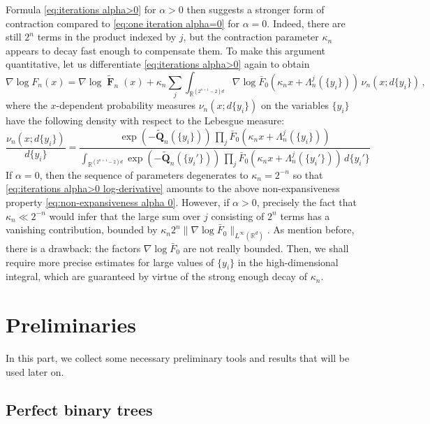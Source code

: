\documentclass[reqno]{amsart}
\DeclareMathOperator{\bF}{\boldsymbol{F}}
\numberwithin{equation}{section}
\begin{document}
{Formula \eqref{eq:iterations alpha>0} for $\alpha>0$ then suggests a stronger form of contraction compared to \eqref{eq:one iteration alpha=0} for $\alpha=0$. Indeed, there are still $2^n$ terms in the product indexed by $j$, but the contraction parameter $\kappa_n$ appears to decay fast enough to compensate them. To make this argument quantitative, let us differentiate \eqref{eq:iterations alpha>0} again to obtain
\begin{equation}\label{eq:iterations alpha>0 log-derivative}
\nabla \log F_n(x) = \nabla \log   \widetilde{\bF}_n (x) + \kappa_n \sum_j \int_{\mathbb{R}^{(2^{n+1}-2)d}} \nabla \log \bar F_0(\kappa_n x+\Lambda_n^j(\{y_i\})) \, \nu_n(x;d\{y_i\}) \,, 
\end{equation}
where the $x$-dependent probability measures $\nu_n(x;d\{y_i\})$ on the variables $\{y_i\}$ have the following density with respect to the Lebesgue measure:
$$
\frac{\nu_n(x;d\{y_i\})}{d\{y_i\}}=\frac{\exp(-\widetilde{\mathbf{Q}}_n(\{y_i\}))\,\prod_j \bar F_0(\kappa_n x+\Lambda_n^j(\{y_i\}))}{\int_{\mathbb{R}^{(2^{n+1}-2)d}}\exp(-\widetilde{\mathbf{Q}}_n(\{y_i'\}))\,\prod_j \bar F_0(\kappa_n x+\Lambda_n^j(\{y_i'\}))\,d\{y_i'\}}
$$
If $\alpha=0$, then the sequence of parameters degenerates to $\kappa_n=2^{-n}$ so that \eqref{eq:iterations alpha>0 log-derivative} amounts to the above non-expansiveness property \eqref{eq:non-expansiveness alpha 0}. However, if $\alpha>0$, precisely the fact that $\kappa_n\ll 2^{-n}$ would infer that the large sum over $j$ consisting of $2^n$ terms has a vanishing contribution, bounded by $\kappa_n 2^n \|\nabla \log \bar F_0 \|_{L^\infty(\mathbb{R}^d)}$. As mention before, there is a drawback: the factors $\nabla \log \bar F_0$ are not really bounded. Then, we shall require more precise estimates for large values of $\{y_i\}$ in the high-dimensional integral, which are guaranteed by virtue of the strong enough decay of $\kappa_n$.   


\section{Preliminaries}\label{S-preliminaries}

In this part, we collect some necessary preliminary tools and results that will be used later on.

\subsection{Perfect binary trees}\label{SS-trees}

}
\end{document}
